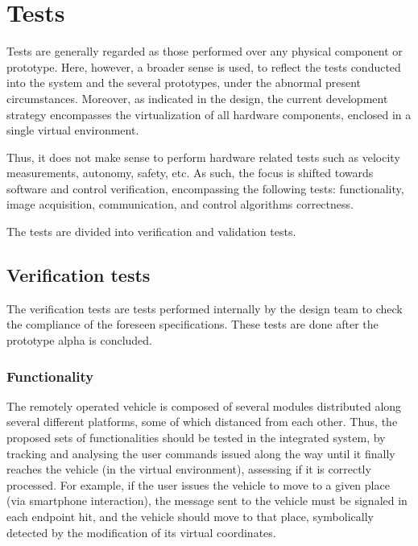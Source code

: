 \section{Tests}%
\label{sec:org3e2776f}
Tests are generally regarded as those performed over any physical
component or prototype. Here, however, a broader sense is used, to reflect the
tests conducted into the system and the several prototypes, under the abnormal
present circumstances.
Moreover, as indicated in the design, the current development
strategy encompasses the virtualization of all hardware components, enclosed
in a single virtual environment.

Thus, it does not make sense to perform
hardware related tests such as velocity measurements, autonomy, safety, etc. As
such, the focus is shifted towards software and control verification,
encompassing the following tests: functionality, image acquisition,
communication, and control algorithms correctness.

The tests are divided into verification and validation tests.
\subsection{Verification tests}%
\label{sec:orge9c79e2}
The verification tests are tests performed internally by the design team to
check the compliance of the foreseen specifications. These tests are done after
the prototype alpha is concluded.

\subsubsection{Functionality}%
\label{sec:functionality}
The remotely operated vehicle is composed of several modules distributed along
several different platforms, some of which distanced from each other. Thus, the
proposed sets of functionalities should be tested in the integrated system, by
tracking and analysing the user commands issued along the way until it finally
reaches the vehicle (in the virtual environment), assessing if it is correctly
processed. For example, if the user issues the vehicle to move to a given place
(via smartphone interaction), the message sent to the vehicle must be signaled
in each endpoint hit, and the vehicle should move to that place, symbolically
detected by the modification of its virtual coordinates.

